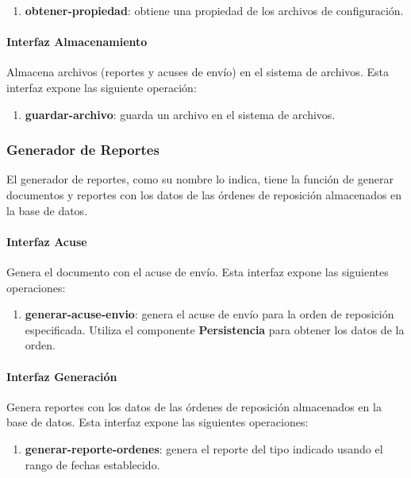 \begin{enumerate}
	\item \textbf{obtener-propiedad}: obtiene una propiedad de los archivos de configuración.
\end{enumerate}


\paragraph{\indent Interfaz Almacenamiento\\}
Almacena archivos (reportes y acuses de envío) en el sistema de archivos. Esta interfaz expone las siguiente operación:
\begin{enumerate}
	\item \textbf{guardar-archivo}: guarda un archivo en el sistema de archivos.
\end{enumerate}

\subsubsection{Generador de Reportes}
El generador de reportes, como su nombre lo indica, tiene la función de generar documentos y reportes con los datos de las órdenes de reposición almacenados en la base de datos. 
\paragraph{\indent Interfaz Acuse\\} Genera el documento con el acuse de envío. Esta interfaz expone las siguientes operaciones:
\begin{enumerate}
	\item \textbf{generar-acuse-envio}: genera el acuse de envío para la orden de reposición especificada. Utiliza el componente \textbf{Persistencia} para obtener los datos de la orden.
\end{enumerate}

\paragraph{\indent Interfaz Generación\\} Genera reportes con los datos de las órdenes de reposición almacenados en la base de datos. Esta interfaz expone las siguientes operaciones:
\begin{enumerate}
	\item \textbf{generar-reporte-ordenes}: genera el reporte del tipo indicado usando el rango de fechas establecido.
\end{enumerate}

